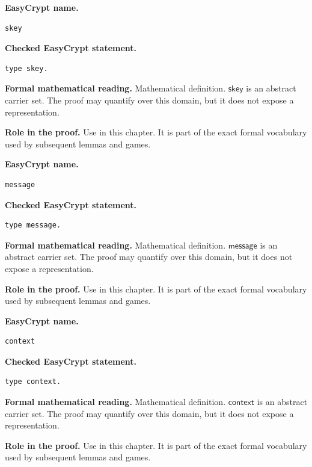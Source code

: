 \begin{formaldefinition}
\noindent\textbf{EasyCrypt name.}
\begin{lstlisting}[language=EasyCrypt,basicstyle=\ttfamily\scriptsize]
skey
\end{lstlisting}
\noindent\textbf{Checked EasyCrypt statement.}
\begin{lstlisting}[language=EasyCrypt,basicstyle=\ttfamily\scriptsize]
type skey.
\end{lstlisting}
\noindent\textbf{Formal mathematical reading.}
Mathematical definition. \(\mathsf{skey}\) is an abstract carrier set.  The proof may quantify over this domain, but it does not expose a representation.

\noindent\textbf{Role in the proof.}
Use in this chapter. It is part of the exact formal vocabulary used by subsequent lemmas and games.

\end{formaldefinition}

\begin{formaldefinition}
\noindent\textbf{EasyCrypt name.}
\begin{lstlisting}[language=EasyCrypt,basicstyle=\ttfamily\scriptsize]
message
\end{lstlisting}
\noindent\textbf{Checked EasyCrypt statement.}
\begin{lstlisting}[language=EasyCrypt,basicstyle=\ttfamily\scriptsize]
type message.
\end{lstlisting}
\noindent\textbf{Formal mathematical reading.}
Mathematical definition. \(\mathsf{message}\) is an abstract carrier set.  The proof may quantify over this domain, but it does not expose a representation.

\noindent\textbf{Role in the proof.}
Use in this chapter. It is part of the exact formal vocabulary used by subsequent lemmas and games.

\end{formaldefinition}

\begin{formaldefinition}
\noindent\textbf{EasyCrypt name.}
\begin{lstlisting}[language=EasyCrypt,basicstyle=\ttfamily\scriptsize]
context
\end{lstlisting}
\noindent\textbf{Checked EasyCrypt statement.}
\begin{lstlisting}[language=EasyCrypt,basicstyle=\ttfamily\scriptsize]
type context.
\end{lstlisting}
\noindent\textbf{Formal mathematical reading.}
Mathematical definition. \(\mathsf{context}\) is an abstract carrier set.  The proof may quantify over this domain, but it does not expose a representation.

\noindent\textbf{Role in the proof.}
Use in this chapter. It is part of the exact formal vocabulary used by subsequent lemmas and games.

\end{formaldefinition}


